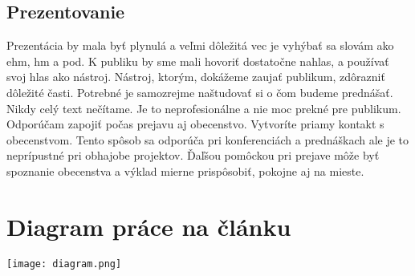 \documentclass[10pt,twoside,slovak,a4paper]{article}
\begin{document}
 \subsection{Prezentovanie}
 Prezentácia by mala byť plynulá a veľmi dôležitá vec je vyhýbať sa slovám ako ehm, hm a pod. K publiku by sme mali hovoriť dostatočne nahlas, a používať svoj hlas ako nástroj. Nástroj, ktorým, dokážeme zaujať publikum, zdôrazniť dôležité časti. Potrebné je samozrejme naštudovať si o čom budeme prednášať. Nikdy celý text nečítame. Je to neprofesionálne a nie moc prekné pre publikum. Odporúčam zapojiť počas prejavu aj obecenstvo. Vytvoríte priamy kontakt s obecenstvom. Tento spôsob sa odporúča pri konferenciách a prednáškach ale je to neprípustné pri obhajobe projektov. Ďaľšou pomôckou pri prejave môže byť spoznanie obecenstva a výklad mierne prispôsobiť, pokojne aj na mieste.

\section{Diagram práce na článku}
\texttt{[image: diagram.png]}



\end{document}
